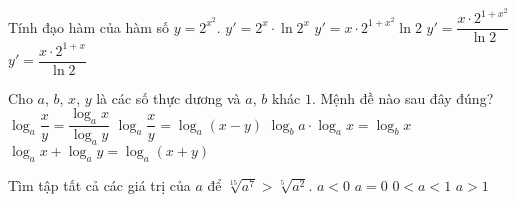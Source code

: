 \begin{ex}%
	Tính đạo hàm của hàm số $y=2^{x^2}$.
	\choice
	{$y'=2^x\cdot\ln 2^x$}
	{\True $y'=x\cdot2^{1+x^2}\ln 2$}
	{$y'=\dfrac{x\cdot2^{1+x^2}}{\ln 2}$}
	{$y'=\dfrac{x\cdot2^{1+x}}{\ln 2}$}
\end{ex}
\begin{ex}%
	Cho $a$, $b$, $x$, $y$ là các số thực dương và $a$, $b$ khác $1$. Mệnh đề nào sau đây đúng?
	\choice
	{$\log _{a} \dfrac{x}{y}=\dfrac{\log _{a} x}{\log _{a} y}$}
	{$\log _{a} \dfrac{x}{y}=\log _{a}(x-y)$}
	{\True $\log _{b} a \cdot \log _{a} x=\log _{b} x$}
	{$\log _{a} x+\log _{a} y=\log _{a}(x+y)$}
\end{ex}
\begin{ex}%
	Tìm tập tất cả các giá trị của $a$ để  $\sqrt[15]{a^7}>\sqrt[5]{a^2}$.
	\choice
	{$a<0$}
	{$a=0$}
	{$0<a<1$}
	{\True $a>1$}
\end{ex}
